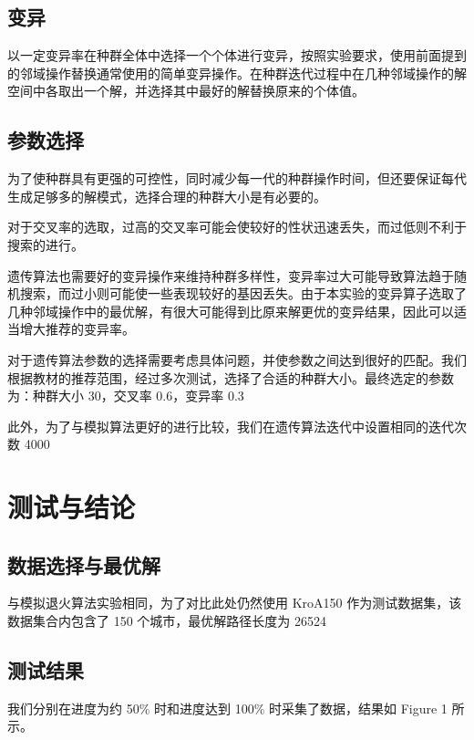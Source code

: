 \subsection{变异}

以一定变异率在种群全体中选择一个个体进行变异，按照实验要求，使用前面提到的邻域操作替换通常使用的简单变异操作。在种群迭代过程中在几种邻域操作的解空间中各取出一个解，并选择其中最好的解替换原来的个体值。

\subsection{参数选择}
为了使种群具有更强的可控性，同时减少每一代的种群操作时间，但还要保证每代生成足够多的解模式，选择合理的种群大小是有必要的。

对于交叉率的选取，过高的交叉率可能会使较好的性状迅速丢失，而过低则不利于搜索的进行。

遗传算法也需要好的变异操作来维持种群多样性，变异率过大可能导致算法趋于随机搜索，而过小则可能使一些表现较好的基因丢失。由于本实验的变异算子选取了几种邻域操作中的最优解，有很大可能得到比原来解更优的变异结果，因此可以适当增大推荐的变异率。

对于遗传算法参数的选择需要考虑具体问题，并使参数之间达到很好的匹配。我们根据教材的推荐范围，经过多次测试，选择了合适的种群大小。最终选定的参数为：种群大小 30，交叉率 0.6，变异率 0.3

此外，为了与模拟算法更好的进行比较，我们在遗传算法迭代中设置相同的迭代次数 4000

\section{测试与结论}

\subsection{数据选择与最优解}
与模拟退火算法实验相同，为了对比此处仍然使用 KroA150 作为测试数据集，该数据集合内包含了 150 个城市，最优解路径长度为 26524 


\subsection{测试结果}
我们分别在进度为约 50\% 时和进度达到 100\% 时采集了数据，结果如 Figure 1 所示。


